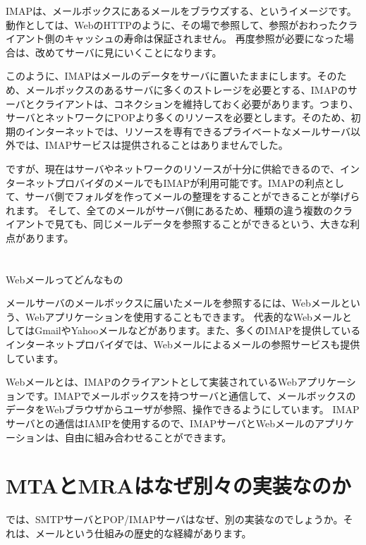 IMAPは、メールボックスにあるメールをブラウズする、というイメージです。動作としては、WebのHTTPのように、その場で参照して、参照がおわったクライアント側のキャッシュの寿命は保証されません。
再度参照が必要になった場合は、改めてサーバに見にいくことになります。

このように、IMAPはメールのデータをサーバに置いたままにします。そのため、メールボックスのあるサーバに多くのストレージを必要とする、IMAPのサーバとクライアントは、コネクションを維持しておく必要があります。つまり、サーバとネットワークにPOPより多くのリソースを必要とします。そのため、初期のインターネットでは、リソースを専有できるプライベートなメールサーバ以外では、IMAPサービスは提供されることはありませんでした。

ですが、現在はサーバやネットワークのリソースが十分に供給できるので、インターネットプロバイダのメールでもIMAPが利用可能です。IMAPの利点として、サーバ側でフォルダを作ってメールの整理をすることができることが挙げられます。
そして、全てのメールがサーバ側にあるため、種類の違う複数のクライアントで見ても、同じメールデータを参照することができるという、大きな利点があります。

\section*{}
\begin{itembox}[l]{Webメールってどんなもの}

メールサーバのメールボックスに届いたメールを参照するには、Webメールという、Webアプリケーションを使用することもできます。
代表的なWebメールとしてはGmailやYahooメールなどがあります。また、多くのIMAPを提供しているインターネットプロバイダでは、Webメールによるメールの参照サービスも提供しています。

Webメールとは、IMAPのクライアントとして実装されているWebアプリケーションです。IMAPでメールボックスを持つサーバと通信して、メールボックスのデータをWebブラウザからユーザが参照、操作できるようにしています。
IMAPサーバとの通信はIAMPを使用するので、IMAPサーバとWebメールのアプリケーションは、自由に組み合わせることができます。

\end{itembox}

\section{MTAとMRAはなぜ別々の実装なのか}

では、SMTPサーバとPOP/IMAPサーバはなぜ、別の実装なのでしょうか。それは、メールという仕組みの歴史的な経緯があります。

